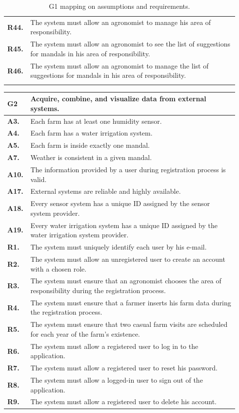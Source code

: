 \begin{longtable}{p{0.06\linewidth} p{0.88\linewidth}}
	\textbf{R44.} & The system must allow an agronomist to manage his area of responsibility.\\
	\textbf{R45.} & The system must allow an agronomist to see the list of suggestions for mandals in his area of responsibility.\\
	\textbf{R46.} & The system must allow an agronomist to manage the list of suggestions for mandals in his area of responsibility.\\
	
    \bottomrule
    \caption{G1 mapping on assumptions and requirements.}
\end{longtable}

\begin{longtable}{p{0.06\linewidth} p{0.88\linewidth}} 
    \toprule
    \textbf{G2} & Acquire, combine, and visualize data from external systems. \\ 
    \midrule
    \textbf{A3.} & Each farm has at least one humidity sensor.\\ 
    \textbf{A4.} & Each farm has a water irrigation system.\\ 
    \textbf{A5.} & Each farm is inside exactly one mandal.\\ 
    \textbf{A7.} & Weather is consistent in a given mandal.\\ 
    \textbf{A10.} & The information provided by a user during registration process is valid.\\ 
    \textbf{A17.} & External systems are reliable and highly available.\\
    \textbf{A18.} & Every sensor system has a unique ID assigned by the sensor system provider. \\
    \textbf{A19.} & Every water irrigation system has a unique ID assigned by the water irrigation system provider. \\
    
    \midrule
	\textbf{R1.} & The system must uniquely identify each user by his e-mail. \\
	\textbf{R2.} & The system must allow an unregistered user to create an account with a chosen role. \\
	\textbf{R3.} & The system must ensure that an agronomist chooses the area of responsibility during the registration process. \\
	\textbf{R4.} & The system must ensure that a farmer inserts his farm data during the registration process.\\
	\textbf{R5.} & The system must ensure that two casual farm visits are scheduled for each year of the farm's existence.\\
	\textbf{R6.} & The system must allow a registered user to log in to the application. \\
	\textbf{R7.} & The system must allow a registered user to reset his password. \\
	\textbf{R8.} & The system must allow a logged-in user to sign out of the application. \\
	\textbf{R9.} & The system must allow a registered user to delete his account. \\
	

\end{longtable}
